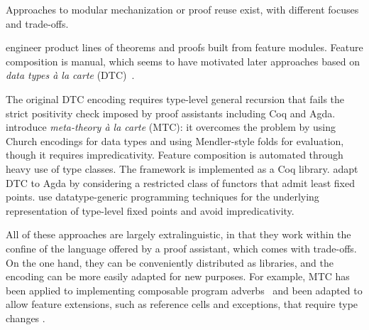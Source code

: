 Approaches to modular mechanization or proof reuse exist,
with different focuses and trade-offs.


\citet{delaware2011} engineer product lines of theorems and proofs built
from feature modules. Feature composition is manual, which seems to have
motivated later approaches based on \emph{data types à la carte} (DTC)~\cite{dtc}.

The original DTC encoding requires type-level general recursion that
fails the strict positivity check imposed by proof assistants including Coq and Agda.
\citet{delaware2013} introduce \emph{meta-theory à la carte} (MTC):
it overcomes the problem by using Church encodings for
data types and using Mendler-style folds for evaluation,
though it requires  impredicativity.
Feature composition is automated through heavy use of type classes.
The framework is implemented as a Coq library.
\citet{schwaab2013modular} adapt DTC to Agda by considering a restricted
class of functors that admit least fixed points.
\citet{keuchel2013generic} use datatype-generic programming techniques
for the underlying representation of type-level fixed points and
avoid  impredicativity.

All of these approaches are largely extra\-linguistic, in that they work
within the confine of the language offered by a proof assistant, which
comes with trade-offs.
On the one hand,
they can be conveniently distributed as libraries, and the encoding can
be more easily adapted for new purposes.
For example, MTC has been applied to implementing
composable program adverbs~\cite{liwei2022} and been adapted to allow
feature extensions, such as reference cells and exceptions, that require type changes
\cite{delaware2013b,vdr2022intrinsically}.

